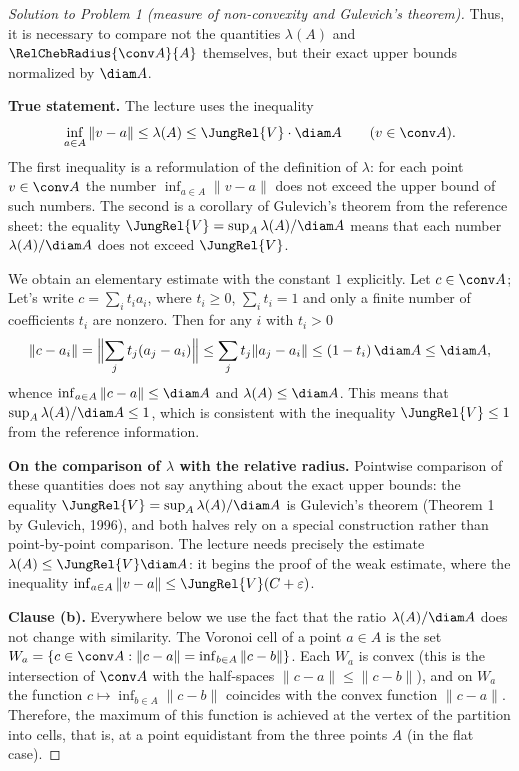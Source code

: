 \documentclass[a4paper,12pt]{report}
\begin{document}
\begin{proof}[Solution to Problem \textup{1} \textup{(}measure of non-convexity and Gulevich's theorem\textup{)}]
Thus, it is necessary to compare not the quantities $\lambda(A)$ and $\RelChebRadius{\conv A}{A}$ themselves, but their exact upper bounds normalized by $\diam A$.

\textbf{True statement.} The lecture uses the inequality
\[
\inf_{a \in A} \|v - a\| \le \lambda(A) \le \JungRel{V} \cdot \diam A \qquad (v \in \conv A).
\]
The first inequality is a reformulation of the definition of $\lambda$: for each point $v \in \conv A$ the number $\inf_{a \in A} \|v - a\|$ does not exceed the upper bound of such numbers. The second is a corollary of Gulevich's theorem from the reference sheet: the equality $\JungRel{V} = \sup_A \lambda(A)/\diam A$ means that each number $\lambda(A)/\diam A$ does not exceed $\JungRel{V}$.

We obtain an elementary estimate with the constant $1$ explicitly. Let $c \in \conv A$; Let's write $c = \sum_i t_i a_i$, where $t_i \ge 0$, $\sum_i t_i = 1$ and only a finite number of coefficients $t_i$ are nonzero. Then for any $i$ with $t_i > 0$
\[
\|c - a_i\| = \Bigl\|\sum_j t_j (a_j - a_i)\Bigr\| \le \sum_j t_j \|a_j - a_i\| \le (1 - t_i)\,\diam A \le \diam A,
\]
whence $\inf_{a \in A} \|c - a\| \le \diam A$ and $\lambda(A) \le \diam A$. This means that $\sup_A \lambda(A)/\diam A \le 1$, which is consistent with the inequality $\JungRel{V} \le 1$ from the reference information.

\textbf{On the comparison of $\lambda$ with the relative radius.} Pointwise comparison of these quantities does not say anything about the exact upper bounds: the equality $\JungRel{V} = \sup_A \lambda(A)/\diam A$ is Gulevich's theorem \textup{(}Theorem \textup{1} by Gulevich, \textup{1996}\textup{)}, and both halves rely on a special construction rather than point-by-point comparison. The lecture needs precisely the estimate $\lambda(A) \le \JungRel{V} \diam A$: it begins the proof of the weak estimate, where the inequality $\inf_{a \in A} \|v - a\| \le \JungRel{V} (C + \varepsilon)$.

\textbf{Clause \textup{(b)}.} Everywhere below we use the fact that the ratio $\lambda(A)/\diam A$ does not change with similarity. The Voronoi cell of a point $a \in A$ is the set $W_a = \{c \in \conv A : \|c - a\| = \inf_{b \in A} \|c - b\|\}$. Each $W_a$ is convex \textup{(}this is the intersection of $\conv A$ with the half-spaces $\|c - a\| \le \|c - b\|$\textup{)}, and on $W_a$ the function $c \mapsto \inf_{b \in A} \|c - b\|$ coincides with the convex function $\|c - a\|$. Therefore, the maximum of this function is achieved at the vertex of the partition into cells, that is, at a point equidistant from the three points $A$ \textup{(}in the flat case\textup{)}.


\end{proof}
\end{document}
